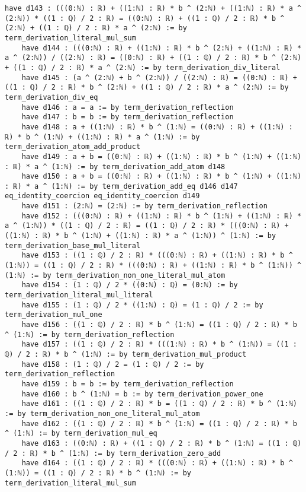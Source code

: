 \documentclass{article}
\begin{document}
\begin{tcolorbox}[colback=white!10, width=\linewidth]
\begin{lstlisting}[language=Lean4]
    have d143 : (((0:ℕ) : ℝ) + ((1:ℕ) : ℝ) * b ^ (2:ℕ) + ((1:ℕ) : ℝ) * a ^ (2:ℕ)) * ((1 : ℚ) / 2 : ℝ) = ((0:ℕ) : ℝ) + ((1 : ℚ) / 2 : ℝ) * b ^ (2:ℕ) + ((1 : ℚ) / 2 : ℝ) * a ^ (2:ℕ) := by term_derivation_literal_mul_sum
    have d144 : (((0:ℕ) : ℝ) + ((1:ℕ) : ℝ) * b ^ (2:ℕ) + ((1:ℕ) : ℝ) * a ^ (2:ℕ)) / ((2:ℕ) : ℝ) = ((0:ℕ) : ℝ) + ((1 : ℚ) / 2 : ℝ) * b ^ (2:ℕ) + ((1 : ℚ) / 2 : ℝ) * a ^ (2:ℕ) := by term_derivation_div_literal
    have d145 : (a ^ (2:ℕ) + b ^ (2:ℕ)) / ((2:ℕ) : ℝ) = ((0:ℕ) : ℝ) + ((1 : ℚ) / 2 : ℝ) * b ^ (2:ℕ) + ((1 : ℚ) / 2 : ℝ) * a ^ (2:ℕ) := by term_derivation_div_eq
    have d146 : a = a := by term_derivation_reflection
    have d147 : b = b := by term_derivation_reflection
    have d148 : a + ((1:ℕ) : ℝ) * b ^ (1:ℕ) = ((0:ℕ) : ℝ) + ((1:ℕ) : ℝ) * b ^ (1:ℕ) + ((1:ℕ) : ℝ) * a ^ (1:ℕ) := by term_derivation_atom_add_product
    have d149 : a + b = ((0:ℕ) : ℝ) + ((1:ℕ) : ℝ) * b ^ (1:ℕ) + ((1:ℕ) : ℝ) * a ^ (1:ℕ) := by term_derivation_add_atom d148
    have d150 : a + b = ((0:ℕ) : ℝ) + ((1:ℕ) : ℝ) * b ^ (1:ℕ) + ((1:ℕ) : ℝ) * a ^ (1:ℕ) := by term_derivation_add_eq d146 d147 eq_identity_coercion eq_identity_coercion d149
    have d151 : (2:ℕ) = (2:ℕ) := by term_derivation_reflection
    have d152 : (((0:ℕ) : ℝ) + ((1:ℕ) : ℝ) * b ^ (1:ℕ) + ((1:ℕ) : ℝ) * a ^ (1:ℕ)) * ((1 : ℚ) / 2 : ℝ) = ((1 : ℚ) / 2 : ℝ) * (((0:ℕ) : ℝ) + ((1:ℕ) : ℝ) * b ^ (1:ℕ) + ((1:ℕ) : ℝ) * a ^ (1:ℕ)) ^ (1:ℕ) := by term_derivation_base_mul_literal
    have d153 : ((1 : ℚ) / 2 : ℝ) * (((0:ℕ) : ℝ) + ((1:ℕ) : ℝ) * b ^ (1:ℕ)) = ((1 : ℚ) / 2 : ℝ) * (((0:ℕ) : ℝ) + ((1:ℕ) : ℝ) * b ^ (1:ℕ)) ^ (1:ℕ) := by term_derivation_non_one_literal_mul_atom
    have d154 : (1 : ℚ) / 2 * ((0:ℕ) : ℚ) = (0:ℕ) := by term_derivation_literal_mul_literal
    have d155 : (1 : ℚ) / 2 * ((1:ℕ) : ℚ) = (1 : ℚ) / 2 := by term_derivation_mul_one
    have d156 : ((1 : ℚ) / 2 : ℝ) * b ^ (1:ℕ) = ((1 : ℚ) / 2 : ℝ) * b ^ (1:ℕ) := by term_derivation_reflection
    have d157 : ((1 : ℚ) / 2 : ℝ) * (((1:ℕ) : ℝ) * b ^ (1:ℕ)) = ((1 : ℚ) / 2 : ℝ) * b ^ (1:ℕ) := by term_derivation_mul_product
    have d158 : (1 : ℚ) / 2 = (1 : ℚ) / 2 := by term_derivation_reflection
    have d159 : b = b := by term_derivation_reflection
    have d160 : b ^ (1:ℕ) = b := by term_derivation_power_one
    have d161 : ((1 : ℚ) / 2 : ℝ) * b = ((1 : ℚ) / 2 : ℝ) * b ^ (1:ℕ) := by term_derivation_non_one_literal_mul_atom
    have d162 : ((1 : ℚ) / 2 : ℝ) * b ^ (1:ℕ) = ((1 : ℚ) / 2 : ℝ) * b ^ (1:ℕ) := by term_derivation_mul_eq
    have d163 : ((0:ℕ) : ℝ) + ((1 : ℚ) / 2 : ℝ) * b ^ (1:ℕ) = ((1 : ℚ) / 2 : ℝ) * b ^ (1:ℕ) := by term_derivation_zero_add
    have d164 : ((1 : ℚ) / 2 : ℝ) * (((0:ℕ) : ℝ) + ((1:ℕ) : ℝ) * b ^ (1:ℕ)) = ((1 : ℚ) / 2 : ℝ) * b ^ (1:ℕ) := by term_derivation_literal_mul_sum

\end{lstlisting}
\end{tcolorbox}
\end{document}
